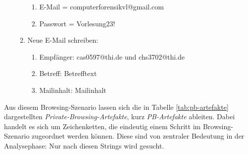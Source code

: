 \begin{enumerate}
\begin{enumerate}[label*=\arabic*.]
\begin{enumerate}[label*=\arabic*.]
			\item E-Mail = \glqq{}computerforensikvl@gmail.com\grqq{}
			\item Passwort = \glqq{}Vorlesung23! \grqq{}
			\end{enumerate}
	\item Neue E-Mail schreiben:
			\begin{enumerate}[label*=\arabic*.]
			\item Empfänger: \glqq{}cas0597@thi.de\grqq{} und \glqq{}chs3702@thi.de\grqq{}
			\item Betreff: \glqq{}Betrefftext\grqq{}
			\item Mailinhalt: \glqq{}Mailinhalt\grqq{}
			\end{enumerate}			
	\end{enumerate}
\end{enumerate}

Aus diesem Browsing-Szenario lassen sich die in Tabelle \ref{tab:pb-artefakte} dargestellten \textit{Private-Browsing-Artefakte}, kurz \textit{PB-Artefakte} ableiten. Dabei handelt es sich um Zeichenketten, die eindeutig einem Schritt im Browsing-Szenario zugeordnet werden können. Diese sind von zentraler Bedeutung in der Analysephase: Nur nach diesen Strings wird gesucht.

